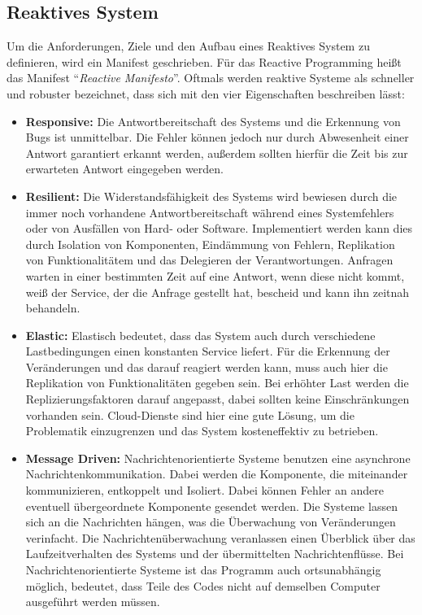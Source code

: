 \subsection*{Reaktives System}
Um die Anforderungen, Ziele und den Aufbau eines Reaktives System zu definieren, wird ein Manifest geschrieben. F\"ur das Reactive Programming hei\ss{}t das Manifest \enquote{\textit{Reactive Manifesto}}\cite{ReaktiveManifest2014}.
Oftmals werden reaktive Systeme als schneller und robuster bezeichnet, dass sich mit den vier Eigenschaften beschreiben l\"asst:
\begin{itemize}
\item \textbf{Responsive:} Die Antwortbereitschaft des Systems und die Erkennung von Bugs ist unmittelbar\cite{Lohmuller2016}. Die Fehler k\"onnen jedoch nur durch Abwesenheit einer Antwort garantiert erkannt werden, au\ss{}erdem sollten hierf\"ur die Zeit bis zur erwarteten Antwort eingegeben werden\cite{ReaktiveManifest2014}.

\item \textbf{Resilient:} Die Widerstandsf\"ahigkeit des Systems wird bewiesen durch die immer noch vorhandene Antwortbereitschaft w\"ahrend eines Systemfehlers oder von Ausf\"allen von Hard- oder Software. Implementiert werden kann dies durch Isolation von Komponenten, Eind\"ammung von Fehlern, Replikation von Funktionalit\"atem und das Delegieren der Verantwortungen\cite{ReaktiveManifest2014}. Anfragen warten in einer bestimmten Zeit auf eine Antwort, wenn diese nicht kommt, wei\ss{} der Service, der die Anfrage gestellt hat, bescheid und kann ihn zeitnah behandeln\cite{Lohmuller2016}.

\item \textbf{Elastic:} Elastisch bedeutet, dass das System auch durch verschiedene Lastbedingungen einen konstanten Service liefert. F\"ur die Erkennung der Ver\"anderungen und das darauf reagiert werden kann, muss auch hier die Replikation von Funktionalit\"aten gegeben sein. Bei erh\"ohter Last werden die Replizierungsfaktoren darauf angepasst, dabei sollten keine Einschr\"ankungen vorhanden sein\cite{ReaktiveManifest2014}. Cloud-Dienste sind hier eine gute L\"osung, um die Problematik einzugrenzen und das System kosteneffektiv zu betrieben\cite{Lohmuller2016}.

\item \textbf{Message Driven:} Nachrichtenorientierte Systeme benutzen eine asynchrone Nachrichtenkommunikation. Dabei werden die Komponente, die miteinander kommunizieren, entkoppelt und Isoliert. Dabei k\"onnen Fehler an andere eventuell \"ubergeordnete Komponente gesendet werden. Die Systeme lassen sich an die Nachrichten h\"angen, was die \"Uberwachung von Ver\"anderungen verinfacht\cite{Lohmuller2016}. Die Nachrichten\"uberwachung veranlassen einen \"Uberblick \"uber das Laufzeitverhalten des Systems und der \"ubermittelten Nachrichtenfl\"usse. Bei Nachrichtenorientierte Systeme ist das Programm auch ortsunabh\"angig m\"oglich, bedeutet, dass Teile des Codes nicht auf demselben Computer ausgef\"uhrt werden m\"ussen\cite{ReaktiveManifest2014}.
\end{itemize}

